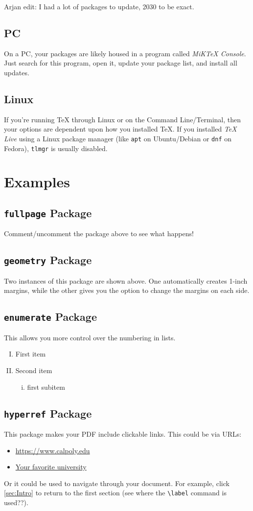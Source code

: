 \documentclass{article} %
\begin{document}
Arjan edit: I had a lot of packages to update, 2030 to be exact.
\subsection{PC} On a PC, your packages are likely housed in a program called \emph{MiKTeX Console}. Just search for this program, open it, update your package list, and install all updates.

\subsection{Linux} If you're running TeX through Linux or on the Command Line/Terminal, then your options are dependent upon how you installed TeX. If you installed \emph{TeX Live} using a Linux package manager (like {\tt apt} on Ubuntu/Debian or {\tt dnf} on Fedora), {\tt tlmgr} is usually disabled.

\section{Examples}
\subsection{{\tt fullpage} Package}
Comment/uncomment the package above to see what happens!

\subsection{{\tt geometry} Package}
Two instances of this package are shown above. One automatically creates 1-inch margins, while the other gives you the option to change the margins on each side.

\subsection{{\tt enumerate} Package }
This allows you more control over the numbering in lists.
\begin{enumerate}[I) ]
	\item First item
	\item Second item
	      \begin{enumerate}[i)]
		      \item first subitem
	      \end{enumerate}
\end{enumerate}

\subsection{{\tt hyperref} Package}
This package makes your PDF include clickable links. This could be via URLs:
\begin{itemize}
	\item \url{https://www.calpoly.edu} %
	\item \href{https://www.calpoly.edu}{Your favorite university} %
\end{itemize}
Or it could be used to navigate through your document. For example, click \ref{sec:Intro} to return to the first section (see where the {\tt \textbackslash label} command is used??).
\end{document}
